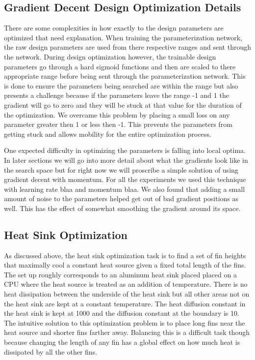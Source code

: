 \documentclass{article} %
\begin{document}
\subsection{Gradient Decent Design Optimization Details}

There are some complexities in how exactly to the design parameters are optimized that need explanation. When training the parameterization network, the raw design parameters are used from there respective ranges and sent through the network. During design optimization however, the trainable design parameters go through a hard sigmoid functions and then are scaled to there appropriate range before being sent through the parameterization network. This is done to ensure the parameters being searched are within the range but also presents a challenge because if the parameters leave the range -1 and 1 the gradient will go to zero and they will be stuck at that value for the duration of the optimization. We overcame this problem by placing a small loss on any parameter greater then 1 or less then -1. This prevents the parameters from getting stuck and allows mobility for the entire optimization process.

One expected difficulty in optimizing the parameters is falling into local optima. In later sections we will go into more detail about what the gradients look like in the search space but for right now we will proscribe a simple solution of using gradient decent with momentum. For all the experiments we used this technique with learning rate blaa and momentum blaa. We also found that adding a small amount of noise to the parameters helped get out of bad gradient positions as well. This has the effect of somewhat smoothing the gradient around its space.

\subsection{Heat Sink Optimization}

As discussed above, the heat sink optimization task is to find a set of fin heights that maximally cool a constant heat source given a fixed total length of the fins. The set up roughly corresponds to an aluminum heat sink placed placed on a CPU where the heat source is treated as an addition of temperature. There is no heat dissipation between the underside of the heat sink but all other areas not on the heat sink are kept at a constant temperature. The heat diffusion constant in the heat sink is kept at 1000 and the diffusion constant at the boundary is 10. The intuitive solution to this optimization problem is to place long fins near the heat source and shorter fins farther away. Balancing this is a difficult task though because changing the length of any fin has a global effect on how much heat is dissipated by all the other fins. 
\end{document}
